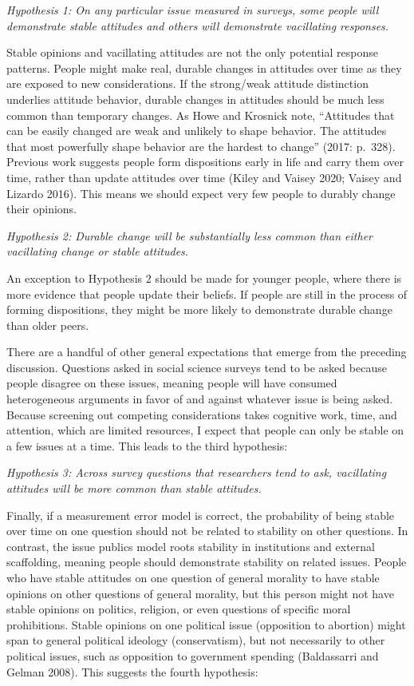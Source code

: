 \documentclass[12pt,]{article}
\begin{document}
\emph{Hypothesis 1: On any particular issue measured in surveys, some people will demonstrate stable attitudes and others will demonstrate vacillating responses.}

Stable opinions and vacillating attitudes are not the only potential response patterns. People might make real, durable changes in attitudes over time as they are exposed to new considerations. If the strong/weak attitude distinction underlies attitude behavior, durable changes in attitudes should be much less common than temporary changes. As Howe and Krosnick note, ``Attitudes that can be easily changed are weak and unlikely to shape behavior. The attitudes that most powerfully shape behavior are the hardest to change'' (2017: p.~328). Previous work suggests people form dispositions early in life and carry them over time, rather than update attitudes over time (Kiley and Vaisey 2020; Vaisey and Lizardo 2016). This means we should expect very few people to durably change their opinions.

\emph{Hypothesis 2: Durable change will be substantially less common than either vacillating change or stable attitudes.}

An exception to Hypothesis 2 should be made for younger people, where there is more evidence that people update their beliefs. If people are still in the process of forming dispositions, they might be more likely to demonstrate durable change than older peers.

There are a handful of other general expectations that emerge from the preceding discussion. Questions asked in social science surveys tend to be asked because people disagree on these issues, meaning people will have consumed heterogeneous arguments in favor of and against whatever issue is being asked. Because screening out competing considerations takes cognitive work, time, and attention, which are limited resources, I expect that people can only be stable on a few issues at a time. This leads to the third hypothesis:

\emph{Hypothesis 3: Across survey questions that researchers tend to ask, vacillating attitudes will be more common than stable attitudes.}

Finally, if a measurement error model is correct, the probability of being stable over time on one question should not be related to stability on other questions. In contrast, the issue publics model roots stability in institutions and external scaffolding, meaning people should demonstrate stability on related issues. People who have stable attitudes on one question of general morality to have stable opinions on other questions of general morality, but this person might not have stable opinions on politics, religion, or even questions of specific moral prohibitions. Stable opinions on one political issue (opposition to abortion) might span to general political ideology (conservatism), but not necessarily to other political issues, such as opposition to government spending (Baldassarri and Gelman 2008). This suggests the fourth hypothesis:
\end{document}
